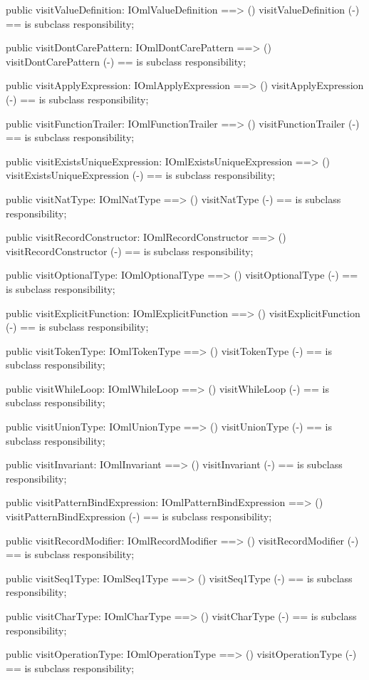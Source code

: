 \begin{vdm_al}
  public visitValueDefinition: IOmlValueDefinition ==> ()
  visitValueDefinition (-) == is subclass responsibility;

  public visitDontCarePattern: IOmlDontCarePattern ==> ()
  visitDontCarePattern (-) == is subclass responsibility;

  public visitApplyExpression: IOmlApplyExpression ==> ()
  visitApplyExpression (-) == is subclass responsibility;

  public visitFunctionTrailer: IOmlFunctionTrailer ==> ()
  visitFunctionTrailer (-) == is subclass responsibility;

  public visitExistsUniqueExpression: IOmlExistsUniqueExpression ==> ()
  visitExistsUniqueExpression (-) == is subclass responsibility;

  public visitNatType: IOmlNatType ==> ()
  visitNatType (-) == is subclass responsibility;

  public visitRecordConstructor: IOmlRecordConstructor ==> ()
  visitRecordConstructor (-) == is subclass responsibility;

  public visitOptionalType: IOmlOptionalType ==> ()
  visitOptionalType (-) == is subclass responsibility;

  public visitExplicitFunction: IOmlExplicitFunction ==> ()
  visitExplicitFunction (-) == is subclass responsibility;

  public visitTokenType: IOmlTokenType ==> ()
  visitTokenType (-) == is subclass responsibility;

  public visitWhileLoop: IOmlWhileLoop ==> ()
  visitWhileLoop (-) == is subclass responsibility;

  public visitUnionType: IOmlUnionType ==> ()
  visitUnionType (-) == is subclass responsibility;

  public visitInvariant: IOmlInvariant ==> ()
  visitInvariant (-) == is subclass responsibility;

  public visitPatternBindExpression: IOmlPatternBindExpression ==> ()
  visitPatternBindExpression (-) == is subclass responsibility;

  public visitRecordModifier: IOmlRecordModifier ==> ()
  visitRecordModifier (-) == is subclass responsibility;

  public visitSeq1Type: IOmlSeq1Type ==> ()
  visitSeq1Type (-) == is subclass responsibility;

  public visitCharType: IOmlCharType ==> ()
  visitCharType (-) == is subclass responsibility;

  public visitOperationType: IOmlOperationType ==> ()
  visitOperationType (-) == is subclass responsibility;


\end{vdm_al}
